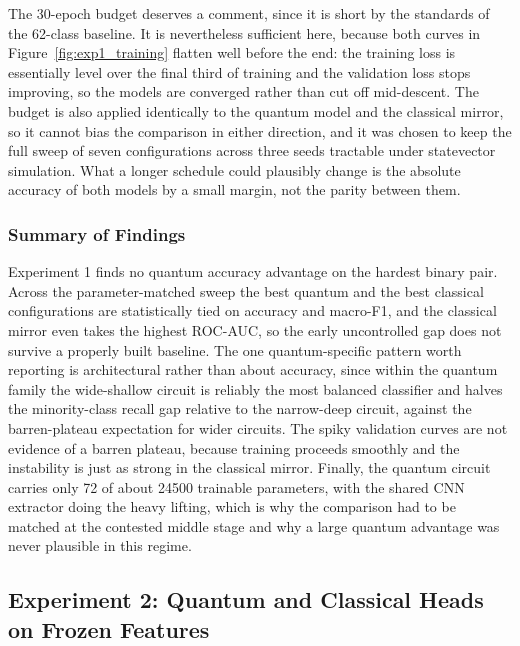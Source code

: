 The 30-epoch budget deserves a comment, since it is short by the standards of the
62-class baseline. It is nevertheless sufficient here, because both curves in
Figure~\ref{fig:exp1_training} flatten well before the end: the training loss is
essentially level over the final third of training and the validation loss stops
improving, so the models are converged rather than cut off mid-descent. The budget is
also applied identically to the quantum model and the classical mirror, so it cannot
bias the comparison in either direction, and it was chosen to keep the full sweep of
seven configurations across three seeds tractable under statevector simulation. What a
longer schedule could plausibly change is the absolute accuracy of both models by a
small margin, not the parity between them.

\subsubsection{Summary of Findings}

Experiment 1 finds no quantum accuracy advantage on the hardest binary pair. Across
the parameter-matched sweep the best quantum and the best classical configurations
are statistically tied on accuracy and macro-F1, and the classical mirror even takes
the highest ROC-AUC, so the early uncontrolled gap does not survive a properly built
baseline. The one quantum-specific pattern worth reporting is architectural rather
than about accuracy, since within the quantum family the wide-shallow circuit is
reliably the most balanced classifier and halves the minority-class recall gap
relative to the narrow-deep circuit, against the barren-plateau expectation for wider
circuits. The spiky validation curves are not evidence of a barren plateau, because
training proceeds smoothly and the instability is just as strong in the classical
mirror. Finally, the quantum circuit carries only 72 of about 24500 trainable
parameters, with the shared CNN extractor doing the heavy lifting, which is why the
comparison had to be matched at the contested middle stage and why a large quantum
advantage was never plausible in this regime.


\subsection{Experiment 2: Quantum and Classical Heads on Frozen Features}
\label{sec:exp2}

